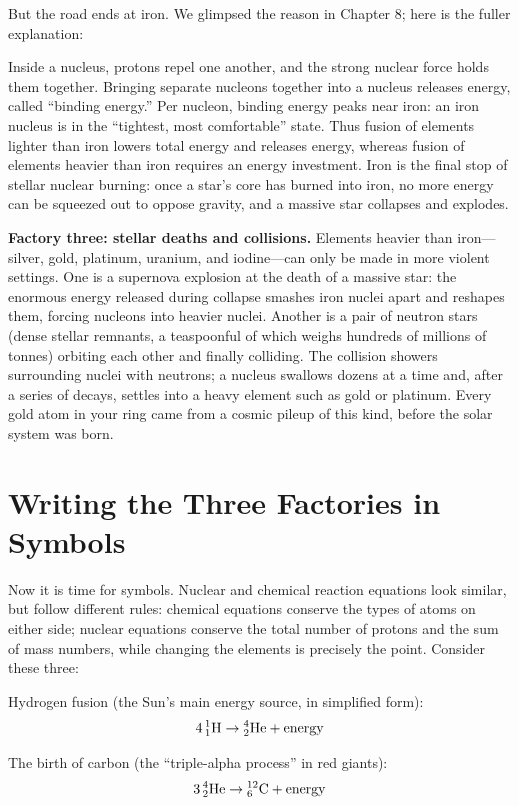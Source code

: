 But the road ends at iron. We glimpsed the reason in Chapter 8; here is the fuller explanation:

\begin{qiaoliang}
Inside a nucleus, protons repel one another, and the strong nuclear force holds them together. Bringing separate nucleons together into a nucleus releases energy, called ``binding energy.'' Per nucleon, binding energy peaks near iron: an iron nucleus is in the ``tightest, most comfortable'' state. Thus fusion of elements lighter than iron lowers total energy and releases energy, whereas fusion of elements heavier than iron requires an energy investment. Iron is the final stop of stellar nuclear burning: once a star's core has burned into iron, no more energy can be squeezed out to oppose gravity, and a massive star collapses and explodes.
\end{qiaoliang}

\textbf{Factory three: stellar deaths and collisions.} Elements heavier than iron---silver, gold, platinum, uranium, and iodine---can only be made in more violent settings. One is a supernova explosion at the death of a massive star: the enormous energy released during collapse smashes iron nuclei apart and reshapes them, forcing nucleons into heavier nuclei. Another is a pair of neutron stars (dense stellar remnants, a teaspoonful of which weighs hundreds of millions of tonnes) orbiting each other and finally colliding. The collision showers surrounding nuclei with neutrons; a nucleus swallows dozens at a time and, after a series of decays, settles into a heavy element such as gold or platinum. Every gold atom in your ring came from a cosmic pileup of this kind, before the solar system was born.

\section{Writing the Three Factories in Symbols}

Now it is time for symbols. Nuclear and chemical reaction equations look similar, but follow different rules: chemical equations conserve the types of atoms on either side; nuclear equations conserve the total number of protons and the sum of mass numbers, while changing the elements is precisely the point. Consider these three:

Hydrogen fusion (the Sun's main energy source, in simplified form):
\[4\,\mathrm{^{1}_{1}H} \rightarrow \mathrm{^{4}_{2}He} + \text{energy}\]

The birth of carbon (the ``triple-alpha process'' in red giants):
\[3\,\mathrm{^{4}_{2}He} \rightarrow \mathrm{^{12}_{6}C} + \text{energy}\]

